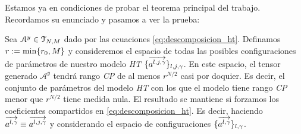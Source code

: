Estamos ya en condiciones de probar el teorema principal del trabajo. Recordamos su enunciado y pasamos a ver la prueba:

\begin{teorema} \label{teorema:teorema_principal_especificacion}
    Sea $\mathcal{A}^y \in \mathcal{T}_{N, M}$ dado por las ecuaciones \eqref{eq:descomposicion_ht}. Definamos $r := \min \{ r_0, M \}$ y consideremos el espacio de todas las posibles configuraciones de parámetros de nuestro modelo \textit{HT} $\{  \overrightarrow{a^{l, j, \gamma}} \}_{l, j, \gamma}$. En este espacio, el tensor generado $\mathcal{A}^y$ tendrá rango \textit{CP} de al menos $r^{N/2}$ casi por doquier. Es decir, el conjunto de parámetros del modelo \textit{HT} con los que el modelo tiene rango \textit{CP} menor que $r^{N/2}$ tiene medida nula. El resultado se mantiene si forzamos los coeficientes compartidos en \eqref{eq:descomposicion_ht}. Es decir, haciendo $\overrightarrow{a^{l, \gamma}} \equiv \overrightarrow{a^{l, j, \gamma}}$ y considerando el espacio de configuraciones $\{ \overrightarrow{a^{l, \gamma}}  \}_{l, \gamma}$.
\end{teorema}

